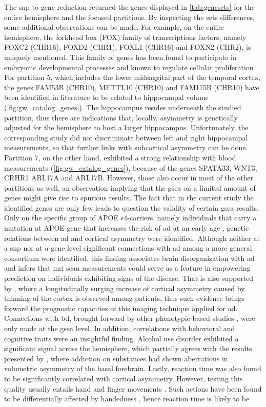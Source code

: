 The \ac{snp} to gene reduction returned the genes displayed in \autoref{tab:genesets} for the entire hemisphere and the focused partitions. By inspecting the sets differences, some additional observations can be made. For example, on the entire hemisphere, the forkhead box (FOX) family of transcriptions factors, namely   FOXC2 (CHR16), FOXD2 (CHR1), FOXL1 (CHR16) and FOXN2 (CHR2), is uniquely mentioned. This family of genes has been found to participate in embryonic developmental processes and known to regulate cellular proliferation \cite{Jackson2010}. For partition 5, which includes the lower midsaggital part of the temporal cortex, the genes FAM53B (CHR10), METTL10 (CHR10) and FAM175B (CHR10) have been identified in literature to be related to hippocampal volume \cite{VanderMeer2020} (\autoref{fig:gw_catalog_genes}). The hippocampus resides underneath the studied partition, thus there are indications that, locally, asymmetry is genetically adjusted for the hemisphere to host a larger hippocampus. Unfortunately, the corresponding study did not discriminate between left and right hippocampal measurements, so that further links with subcortical asymmetry can be done. Partition 7, on the other hand, exhibited a strong relationship with blood measurements (\autoref{fig:gw_catalog_genes}), because of the genes SPATA33, WNT3, CRHR1 ARL17A and ARL17B. However, those also occur in most of the other partitions as well, an observation implying that the \ac{gsea} on a limited amount of genes might give rise to spurious results. The fact that in the current study the identified genes are only few leads to question the validity of certain \ac{gsea} results. Only on the specific group of APOE $\epsilon$4-carriers, namely individuals that carry a mutation at APOE gene that increases the risk of \ac{ad} at an early age \cite{Michaelson2014},  genetic relations between \ac{ad} and cortical asymmetry were identified. Although neither at a \ac{snp} nor at a gene level significant connections with \ac{ad} among a more general consortium were identified, this finding associates brain disorganization with \ac{ad} and infers that \ac{mri} scan measurements  could serve as a feature in empowering prediction on individuals exhibiting signs of the disease. That is also supported by \citet{Roe2021}, where a longitudinally surging increase of cortical asymmetry caused by thinning of the cortex is observed among patients, thus such evidence brings forward the prognostic capacities of this imaging technique applied for \ac{ad}. Connections with \ac{bd}, brought forward by other phenotypic-based studies \cite{Wang2018}, were only made at the \ac{gsea} level. In addition, correlations with behavioral and cognitive traits were an insightful finding. Alcohol use disorder exhibited a significant signal across the hemisphere, which partially agrees with the results presented by \citet{Cao2021}, where addiction on substances had shown aberrations in volumetric asymmetry of the basal forebrain. Lastly, reaction time was also found to be significantly correlated with cortical asymmetry. However, testing this quality usually entails hand and finger movements \cite{Brenner2019}. Such actions have been found to be differentially affected by handedness \cite{Cheng2020}, hence reaction time is likely to be 
